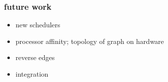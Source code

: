 \begin{frame}[fragile]
\frametitle{future work}

\begin{itemize}[<alert@+>]

\item new schedulers

\item processor affinity;  topology of graph on hardware

\item reverse edges

\item integration
\end{itemize}

\end{frame}



